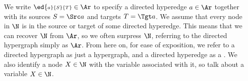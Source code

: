 \begin{defn}
{    %
                We write $\ed {\scriptstyle a}{S}{T} \in \Ar$ to specify
    a directed hyperedge
                $a \in \Ar$ together with its sources $S = \Src a$ and targets $T = \Tgt a$.
    We assume that every node in $\N$ is in the source or target of some
    directed hyperedge.  
    This means that we can recover $\N$ from $\Ar$, so
    we often surpress $\N$, referring to the
    directed hypergraph simply as $\Ar$.
    From here on, for ease of exposition, we refer to  a directed
    hypergraph as just a 
    hypergraph, and a directed hyperedge as a \emph{\hyperarc}.  We
    also identify a node $X \in \N$ with the variable associated with
    it, so talk about a variable $X \in \N$.
    }
\end{defn}

